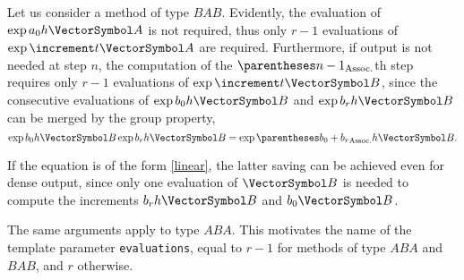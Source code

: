 \documentclass[10pt, a4paper, oneside]{basestyle}
\begin{document}
Let us consider a method of type $BAB$. 
Evidently, the evaluation of $\exp a_0h\vA$
is not required, thus only $r-1$ evaluations of  $\exp \increment t\vA$ are
required.
Furthermore, if output is not needed at step $n$, the computation of
the $\pa{n-1}$th step requires only $r-1$ evaluations of
$\exp \increment t\vB$, since the consecutive evaluations of $\exp b_0h\vB$
and $\exp b_rh\vB$ can be merged by the group property,\[
\exp b_0h\vB\exp b_rh\vB=\exp \pa{b_0+b_r}h\vB\text.
\]

If the equation is of the form \ref{linear}, the latter saving can be achieved even
for dense output, since only one evaluation of $\vB$ is needed to compute the
increments $b_rh\vB$ and $b_0\vB$.

The same arguments apply to type $ABA$.
This motivates the name of the template
parameter \texttt{evaluations}, equal to $r-1$ for methods of type $ABA$ and
$BAB$, and $r$ otherwise.
\end{document}
